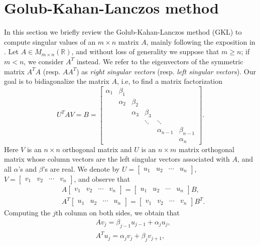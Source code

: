 \documentclass{article}
\theoremstyle{definition}
\begin{document}
\section{Golub-Kahan-Lanczos method}
\label{appdx_GKL}
In this section we briefly review the Golub-Kahan-Lanczos method (GKL) to compute singular values of an $m\times n$ matrix $A$,
mainly following the exposition in \cite[Section 6.3.3]{MR1792141}.
Let $A\in M_{m\times n}(\mathbb{R})$,
and without loss of generality
we suppose that $m\geq n$; if $m<n$, we consider $A^T$ instead.
We refer to the eigenvectors of the symmetric matrix $A^TA$ (resp. $AA^T$) as \emph{right singular vectors} (resp. \emph{left singular vectors}).
Our goal is to bidiagonalize the matrix $A$,
i.e,
to find a matrix factorization
\[
U^TAV
=
B
=
\begin{bmatrix}
    \alpha_1 & \beta_1 & & & & \\
    & \alpha_2 & \beta_2 & \\
    & & \alpha_3 & \beta_3 \\
    & & & \ddots & \ddots \\
    & & & & \alpha_{n-1} & \beta_{n-1}\\
    & & & & & \alpha_n
\end{bmatrix}.
\]
Here $V$ is an $n\times n$ orthogonal matrix and $U$ is an $n\times m$ matrix orthogonal matrix whose column vectors are the left singular vectors associated with $A$,
and all $\alpha$'s and $\beta$'s are real.
We denote by 
$U=
\begin{bmatrix}
u_1 & u_2 & \cdots & u_n
\end{bmatrix}
$,
$V=
\begin{bmatrix}
v_1 & v_2 & \cdots & v_n
\end{bmatrix}
$,
and observe that
\[
\begin{aligned}
&A
\begin{bmatrix}
v_1 & v_2 & \cdots & v_n
\end{bmatrix}
=
\begin{bmatrix}
u_1 & u_2 & \cdots & u_n
\end{bmatrix}
B,\\
&A^T\begin{bmatrix}
u_1 & u_2 & \cdots & u_n
\end{bmatrix}
=
\begin{bmatrix}
v_1 & v_2 & \cdots & v_n
\end{bmatrix}
B^T.
\end{aligned}
\]
Computing the $j$th column on both sides,
we obtain that
\[
\begin{aligned}
&Av_j=\beta_{j-1}u_{j-1}+\alpha_ju_j,\\
&A^Tu_j = \alpha_jv_j+\beta_jv_{j+1},
\end{aligned}
\]
\end{document}
